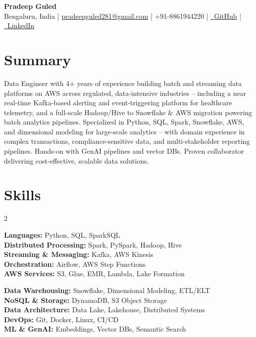 \documentclass[letterpaper,10pt]{article}
\begin{document}
\begin{center}
  {\LARGE \textbf{Pradeep Guled}} \\[4pt]
  \small
  Bengaluru, India \;|\;
  \href{mailto:pradeepguled281@gmail.com}{pradeepguled281@gmail.com} \;|\;
  +91-8861944220 \;|\;
  \href{https://github.com/Pradeepguled/}{\faGithub\ GitHub} \;|\;
  \href{https://www.linkedin.com/in/pradeep-guled}{\faLinkedin\ LinkedIn}
\end{center}

\vspace{-6pt}

\section{Summary}
\small{Data Engineer with 4+ years of experience building batch and streaming data platforms on AWS across regulated, data-intensive industries -- including a near real-time Kafka-based alerting and event-triggering platform for healthcare telemetry, and a full-scale Hadoop/Hive to Snowflake \& AWS migration powering batch analytics pipelines. Specialized in Python, SQL, Spark, Snowflake, AWS, and dimensional modeling for large-scale analytics -- with domain experience in complex transactions, compliance-sensitive data, and multi-stakeholder reporting pipelines. Hands-on with GenAI pipelines and vector DBs. Proven collaborator delivering cost-effective, scalable data solutions.}

\vspace{2pt}

\section{Skills}
\begin{multicols}{2}
\small{
\textbf{Languages:} Python, SQL, SparkSQL \\[1pt]
\textbf{Distributed Processing:} Spark, PySpark, Hadoop, Hive \\[1pt]
\textbf{Streaming \& Messaging:} Kafka, AWS Kinesis \\[1pt]
\textbf{Orchestration:} Airflow, AWS Step Functions \\[1pt]
\textbf{AWS Services:} S3, Glue, EMR, Lambda, Lake Formation

\columnbreak

\textbf{Data Warehousing:} Snowflake, Dimensional Modeling, ETL/ELT \\[1pt]
\textbf{NoSQL \& Storage:} DynamoDB, S3 Object Storage \\[1pt]
\textbf{Data Architecture:} Data Lake, Lakehouse, Distributed Systems \\[1pt]
\textbf{DevOps:} Git, Docker, Linux, CI/CD \\[1pt]
\textbf{ML \& GenAI:} Embeddings, Vector DBs, Semantic Search
}
\end{multicols}
\end{document}
